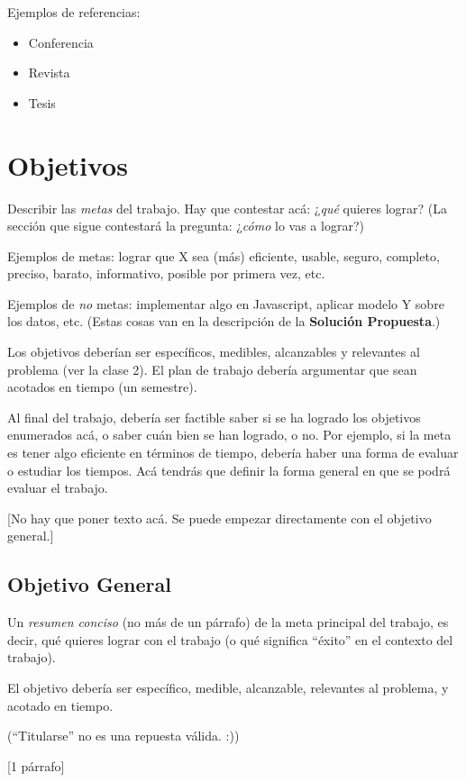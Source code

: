 \documentclass[guia]{upropuesta}
\begin{document}
Ejemplos de referencias:

\begin{itemize}
  \item Conferencia~\cite{CorlessJK97}
  \item Revista~\cite{NewmanT42}
  \item Tesis~\cite{Turing38}
\end{itemize}


\section{Objetivos}\label{chap:obj}

\begin{pauta}
Describir las \textit{metas} del trabajo. Hay que contestar acá: ¿\textit{qué} quieres lograr? (La sección que sigue contestará la pregunta: ¿\textit{cómo} lo vas a lograr?)

Ejemplos de metas: lograr que X sea (más) eficiente, usable, seguro, completo, preciso, barato, informativo, posible por primera vez, etc.

Ejemplos de \textit{no} metas: implementar algo en Javascript, aplicar modelo Y sobre los datos, etc. (Estas cosas van en la descripción de la \textbf{Solución Propuesta}.)

Los objetivos deberían ser específicos, medibles, alcanzables y relevantes al problema (ver la clase 2). El plan de trabajo debería argumentar que sean acotados en tiempo (un semestre).

Al final del trabajo, debería ser factible saber si se ha logrado los objetivos enumerados acá, o saber cuán bien se han logrado, o no. Por ejemplo, si la meta es tener algo eficiente en términos de tiempo, debería haber una forma de evaluar o estudiar los tiempos. Acá tendrás que definir la forma general en que se podrá evaluar el trabajo.

[No hay que poner texto acá. Se puede empezar directamente con el objetivo general.]
\end{pauta}

  \subsection*{Objetivo General}\label{sec:obj-g}
  
  \begin{pauta}
  Un \textit{resumen conciso} (no más de un párrafo) de la meta principal del trabajo, es decir, qué quieres lograr con el trabajo (o qué significa ``éxito'' en el contexto del trabajo).
  
  El objetivo debería ser específico, medible, alcanzable, relevantes al problema, y acotado en tiempo.
  
  (``Titularse'' no es una repuesta válida. :))
  
  [1 párrafo]
  \end{pauta}
\end{document}

